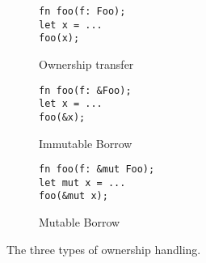 \begin{figure}[ht]
  \begin{subfigure}{0.3\textwidth}
    \caption{Ownership transfer\label{fig:ownership-transfer}}
    \begin{lstlisting}[style=Rust]
fn foo(f: Foo);
let x = ...
foo(x);\end{lstlisting}
  \end{subfigure}%
  \hfill
  \begin{subfigure}{0.3\textwidth}
    \caption{Immutable Borrow\label{fig:immutable-borrow}}
    \begin{lstlisting}[style=Rust]
fn foo(f: &Foo);
let x = ...
foo(&x);\end{lstlisting}
  \end{subfigure}%
  \hfill
  \begin{subfigure}{0.3\textwidth}
    \caption{Mutable Borrow\label{fig:mutable-borrow}}
    \begin{lstlisting}[style=Rust]
fn foo(f: &mut Foo);
let mut x = ...
foo(&mut x);\end{lstlisting}
  \end{subfigure}%
  \caption{The three types of ownership handling.\label{fig:rust-ownership}}
\end{figure}
